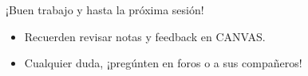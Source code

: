 \documentclass[10pt]{beamer}
\begin{document}
\begin{frame}
  \Huge{\centerline{¡Buen trabajo y hasta la próxima sesión!}}
  \vspace{0.5cm}
  \normalsize
  \begin{itemize}
    \item Recuerden revisar notas y feedback en CANVAS.
    \item Cualquier duda, ¡pregúnten en foros o a sus compañeros!
  \end{itemize}
\end{frame}
\end{document}
